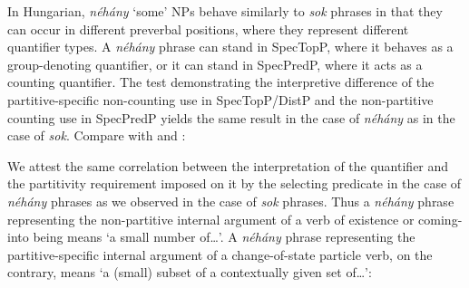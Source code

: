 \documentclass[output=paper]{langscibook}
\begin{document}
\eal
{}
\zl

\noindent In Hungarian, \textit{néhány} `some' NPs behave similarly to \textit{sok} phrases in that they can occur in different preverbal positions, where they represent different quantifier types. A \textit{néhány} phrase can stand in SpecTopP, where it behaves as a group-denoting quantifier, or it can stand in SpecPredP, where it acts as a counting quantifier. The test demonstrating the interpretive difference of the partitive-specific non-counting use in SpecTopP/DistP and the non-partitive counting use in SpecPredP yields the same result in the case of \textit{néhány} as in the case of \textit{sok}. Compare with  and :

\eal
{}
\zl

\noindent We attest the same correlation between the interpretation of the quantifier and the partitivity requirement imposed on it by the selecting predicate in the case of \textit{néhány} phrases as we observed in the case of  \textit{sok} phrases. Thus a \textit{néhány} phrase representing the non-partitive internal argument of a verb of existence or coming-into being means `a small number of\dots'. A \textit{néhány} phrase representing the partitive-specific internal argument of a change-of-state particle verb, on the contrary, means `a (small) subset of a contextually given set of\dots':
\end{document}
